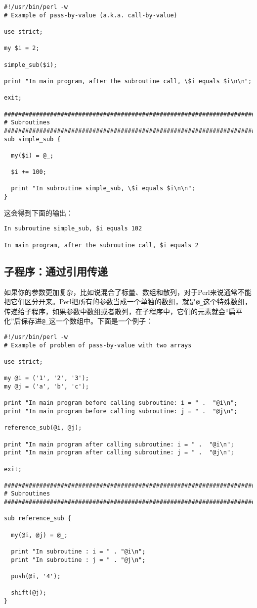 \begin{lstlisting}
#!/usr/bin/perl -w
# Example of pass-by-value (a.k.a. call-by-value)

use strict;

my $i = 2;

simple_sub($i);

print "In main program, after the subroutine call, \$i equals $i\n\n";

exit;

################################################################################
# Subroutines
################################################################################
sub simple_sub {

  my($i) = @_;

  $i += 100;

  print "In subroutine simple_sub, \$i equals $i\n\n";
}
\end{lstlisting}

这会得到下面的输出：

\begin{lstlisting}
In subroutine simple_sub, $i equals 102

In main program, after the subroutine call, $i equals 2
\end{lstlisting}

\subsection{子程序：通过引用传递}
如果你的参数更加复杂，比如说混合了标量、数组和散列，对于Perl来说通常不能把它们区分开来。Perl把所有的参数当成一个单独的数组，就是\verb|@_|这个特殊数组，传递给子程序，如果参数中数组或者散列，在子程序中，它们的元素就会“扁平化”后保存进\verb|@_|这一个数组中。下面是一个例子：

\begin{lstlisting}
#!/usr/bin/perl -w
# Example of problem of pass-by-value with two arrays

use strict;

my @i = ('1', '2', '3');
my @j = ('a', 'b', 'c');

print "In main program before calling subroutine: i = " .  "@i\n";
print "In main program before calling subroutine: j = " .  "@j\n";

reference_sub(@i, @j);

print "In main program after calling subroutine: i = " .  "@i\n";
print "In main program after calling subroutine: j = " .  "@j\n";

exit;

################################################################################
# Subroutines
################################################################################

sub reference_sub {

  my(@i, @j) = @_;

  print "In subroutine : i = " . "@i\n";
  print "In subroutine : j = " . "@j\n";

  push(@i, '4');

  shift(@j);
}
\end{lstlisting}

